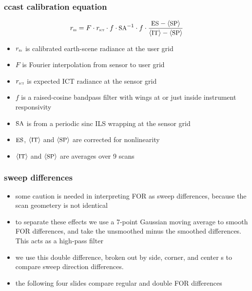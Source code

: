 \documentclass[11pt]{beamer}
\begin{document}
\begin{frame}
\frametitle{ccast calibration equation}

\[r_{\mbox{\tiny\textsc{es}}} = F \cdot r_{\mbox{\tiny\textsc{ict}}} \cdot f \cdot \mbox{\small SA}^{-1}\cdot f \cdot 
         \frac{\mbox{\small ES} - \langle\mbox{\small SP}\rangle}{\langle\mbox{\small IT}\rangle - \langle\mbox{\small SP}\rangle} \]

\begin{itemize}
  \item $r_{\mbox{\tiny\textsc{es}}}$ is calibrated earth-scene radiance at the user grid
  \item $F$ is Fourier interpolation from sensor to user grid
  \item $r_{\mbox{\tiny\textsc{ict}}}$ is expected ICT radiance at the sensor grid
  \item $f$ is a raised-cosine bandpass filter with wings at or just
    inside instrument responsivity
  \item $\mbox{\small SA}$ is from a periodic sinc ILS wrapping at the sensor
    grid
  \item $\mbox{\small ES}$, $\langle\mbox{\small IT}\rangle$ and $\langle\mbox{\small SP}\rangle$ are corrected for
    nonlinearity
  \item $\langle\mbox{\small IT}\rangle$ and $\langle\mbox{\small SP}\rangle$ are averages over 9 scans
\end{itemize}

\end{frame}
\begin{frame}
\frametitle{sweep differences}

\begin{itemize}

  \item some caution is needed in interpreting FOR as sweep
    differences, because the scan geometery is not identical

  \item to separate these effects we use a 7-point Gaussian moving
    average to smooth FOR differences, and take the unsmoothed minus
    the smoothed differences.  This acts as a high-pass filter

  \item we use this double difference, broken out by side, corner,
    and center {\fov}s to compare sweep direction differences.

  \item the following four slides compare regular and double FOR
    differences

\end{itemize}

\end{frame}
\end{document}
